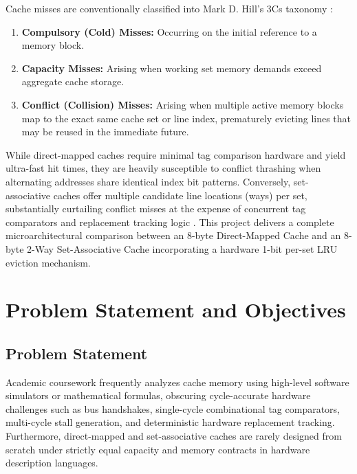 \documentclass[10pt,twocolumn]{article}
\begin{document}
Cache misses are conventionally classified into Mark D. Hill's 3Cs taxonomy \cite{hill1987}:
\begin{enumerate}
    \item \textbf{Compulsory (Cold) Misses:} Occurring on the initial reference to a memory block.
    \item \textbf{Capacity Misses:} Arising when working set memory demands exceed aggregate cache storage.
    \item \textbf{Conflict (Collision) Misses:} Arising when multiple active memory blocks map to the exact same cache set or line index, prematurely evicting lines that may be reused in the immediate future.
\end{enumerate}

While direct-mapped caches require minimal tag comparison hardware and yield ultra-fast hit times, they are heavily susceptible to conflict thrashing when alternating addresses share identical index bit patterns. Conversely, set-associative caches offer multiple candidate line locations (ways) per set, substantially curtailing conflict misses at the expense of concurrent tag comparators and replacement tracking logic \cite{smith1982}. This project delivers a complete microarchitectural comparison between an 8-byte Direct-Mapped Cache and an 8-byte 2-Way Set-Associative Cache incorporating a hardware 1-bit per-set LRU eviction mechanism.

\section{Problem Statement and Objectives}
\subsection{Problem Statement}
Academic coursework frequently analyzes cache memory using high-level software simulators or mathematical formulas, obscuring cycle-accurate hardware challenges such as bus handshakes, single-cycle combinational tag comparators, multi-cycle stall generation, and deterministic hardware replacement tracking. Furthermore, direct-mapped and set-associative caches are rarely designed from scratch under strictly equal capacity and memory contracts in hardware description languages.
\end{document}

